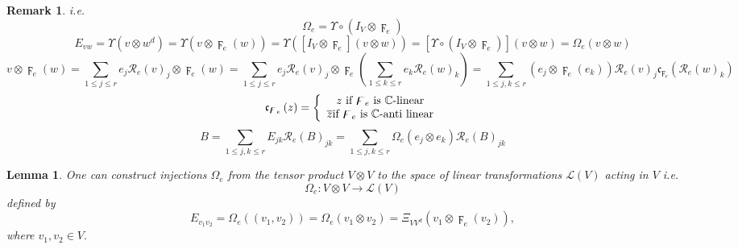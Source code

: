 \documentclass[aps,preprint]{revtex4}%
\newtheorem{lemma}[theorem]{Lemma}
\newtheorem{remark}[theorem]{Remark}
\begin{document}
\begin{remark}
i.e.%
\begin{equation}
\Omega_{e}=\Upsilon\circ\left(  I_{V}\otimes\digamma_{e}\right)
\end{equation}%
\begin{equation}
E_{vw}=\Upsilon\left(  v\otimes w^{d}\right)  =\Upsilon\left(  v\otimes
\digamma_{e}\left(  w\right)  \right)  =\Upsilon\left(  \left[
\overset{}{I_{V}\otimes\digamma_{e}}\right]  \left(  v\otimes w\right)
\right)  =\left[  \Upsilon\circ\left(  \overset{}{I_{V}\otimes\digamma_{e}%
}\right)  \right]  \left(  v\otimes w\right)  =\Omega_{e}\left(  v\otimes
w\right)
\end{equation}%
\begin{equation}
v\otimes\digamma_{e}\left(  w\right)  =\sum_{1\leq j\leq r}e_{j}%
\mathcal{R}_{e}\left(  v\right)  _{j}\otimes\digamma_{e}\left(  w\right)
=\sum_{1\leq j\leq r}e_{j}\mathcal{R}_{e}\left(  v\right)  _{j}\otimes
\digamma_{e}\left(  \sum_{1\leq k\leq r}e_{k}\mathcal{R}_{e}\left(  w\right)
_{k}\right)  =\sum_{1\leq j,k\leq r}\left(  e_{j}\otimes\digamma_{e}\left(
e_{k}\right)  \right)  \mathcal{R}_{e}\left(  v\right)  _{j}\mathfrak{c}%
_{\digamma_{e}}\left(  \mathcal{R}_{e}\left(  w\right)  _{k}\right)
\end{equation}%
\begin{equation}
\mathfrak{c}_{\digamma_{e}}\left(  z\right)  =\left\{
\begin{array}
[c]{c}%
z\text{ if }\digamma_{e}\text{ is }\mathbb{C}\text{-linear}\\
\overline{z}\text{if }\digamma_{e}\text{ is }\mathbb{C}\text{-anti linear}%
\end{array}
\right.
\end{equation}%
\begin{equation}
B=\sum_{1\leq j,k\leq r}E_{jk}\mathcal{R}_{e}\left(  B\right)  _{jk}%
=\sum_{1\leq j,k\leq r}\Omega_{e}\left(  e_{j}\otimes e_{k}\right)
\mathcal{R}_{e}\left(  B\right)  _{jk}%
\end{equation}

\end{remark}

\begin{lemma}
One can construct injections $\Omega_{e}$ from the tensor product $V\otimes V$
to the space of linear transformations $\mathcal{L}\left(  V\right)  $ acting
in $V$ i.e.
\begin{equation}
\Omega_{e}:V\otimes V\rightarrow\mathcal{L}\left(  V\right)
\end{equation}
defined by
\begin{equation}
E_{v_{1}v_{2}}=\Omega_{e}\left(  \left(  v_{1},v_{2}\right)  \right)
=\Omega_{e}\left(  v_{1}\otimes v_{2}\right)  =\Xi_{VV^{d}}\left(
v_{1}\otimes\digamma_{e}\left(  v_{2}\right)  \right)  ,
\end{equation}
where $v_{1},v_{2}\in V.$
\end{lemma}
\end{document}
